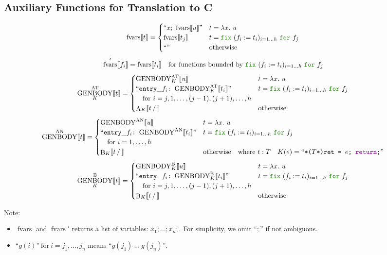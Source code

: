 \documentclass[a4paper,fleqn]{article}
\newcommand{\kwfix}{\mbox{\color{mygreen}\ttfamily fix}}
\newcommand{\kwfor}{\mbox{\color{mygreen}\ttfamily for}}
\newcommand{\lam}[2]{\lambda #1.~#2}
\newcommand{\fix}[4]{\kwfix~(#1 := #2)_{#3}~\kwfor~#4}
\newcommand{\BRA}[1]{\llbracket #1 \rrbracket}
\DeclareMathOperator{\genbody}{GENBODY}
\newcommand{\genbodyat}[2]{\genbody^\mathrm{AT}_{#1}\BRA{#2}}
\newcommand{\genbodyan}[1]{\genbody^\mathrm{AN}\BRA{#1}}
\newcommand{\genbodyb}[2]{\genbody^\mathrm{B}_{#1}\BRA{#2}}
\newcommand{\dq}[1]{\text{``}#1\text{''}}
\newcommand{\ttcolon}{\texttt{:}}
\newcommand{\kwCreturn}{\mbox{\color{myviolet}\ttfamily return}}
\DeclareMathOperator{\fvarsop}{fvars}
\newcommand{\fvars}[1]{\fvarsop\BRA{#1}}
\newcommand{\fvarsd}[1]{\fvarsop'\BRA{#1}}
\DeclareMathOperator{\Aop}{A}
\DeclareMathOperator{\Bop}{B}
\newcommand{\A}[3]{\Aop_{#1}\BRA{#2\,/\,#3}}
\newcommand{\B}[3]{\Bop_{#1}\BRA{#2\,/\,#3}}
\begin{document}
\subsection{Auxiliary Functions for Translation to C}\label{sec:aux-function}
\raggedright
\[
  \fvars{t} =
  \begin{cases}
    \dq{x;~\fvars{u}} & t = \lam{x}{u} \\
    \fvars{t_j}       & t = \fix{f_i}{t_i}{i=1\dots h}{f_j} \\
    \dq{}             & \text{otherwise}
  \end{cases}
\]
\[
  \fvarsd{f_i} = \fvars{t_i} \quad \text{for functions bounded by $\fix{f_i}{t_i}{i=1\dots h}{f_j}$}
\]
\[
  \genbodyat{K}{t} =
  \begin{cases}
    \genbodyat{K}{u}                            & t = \lam{x}{u} \\
    \dq{\mathtt{entry\_}f_i\ttcolon~\genbodyat{K}{t_i}} & t = \fix{f_i}{t_i}{i=1\dots h}{f_j} \\
    \quad \text{for}~i=j, 1,\dots, (j-1), (j+1),\dots, h \\
    \A{K}{t}{}                            & \text{otherwise}
  \end{cases}
\]
\[
  \genbodyan{t} =
  \begin{cases}
    \genbodyan{u}                            & t = \lam{x}{u} \\
    \dq{\mathtt{entry\_}f_i\ttcolon~\genbodyan{t_i}} & t = \fix{f_i}{t_i}{i=1\dots h}{f_j} \\
    \quad \text{for}~i=1,\dots, h \\
    \B{K}{t}{}                            & \text{otherwise} \quad \text{where}~t:T \quad K(e) = \dq{\texttt{*($T$*)ret = $e$; \kwCreturn;}}
  \end{cases}
\]
\[
  \genbodyb{K}{t} =
  \begin{cases}
    \genbodyb{K}{u}                            & t = \lam{x}{u} \\
    \dq{\mathtt{entry\_}f_i\ttcolon~\genbodyb{K}{t_i}} & t = \fix{f_i}{t_i}{i=1\dots h}{f_j} \\
    \quad \text{for}~i=j, 1,\dots, (j-1), (j+1),\dots, h \\
    \B{K}{t}{}                            & \text{otherwise}
  \end{cases}
\]
{\small Note:
\begin{itemize}
  \item $\fvarsop$ and $\fvarsop'$ returns a list of variables: $x_1;\dots;x_n;$.  For simplicity, we omit ``$;$'' if not ambiguous.
  \item $\dq{g(i)}~\text{for}~i=j_1,\dots,j_n$ means $\dq{g(j_1)~\dots~g(j_n)}$.
\end{itemize}}
\end{document}
